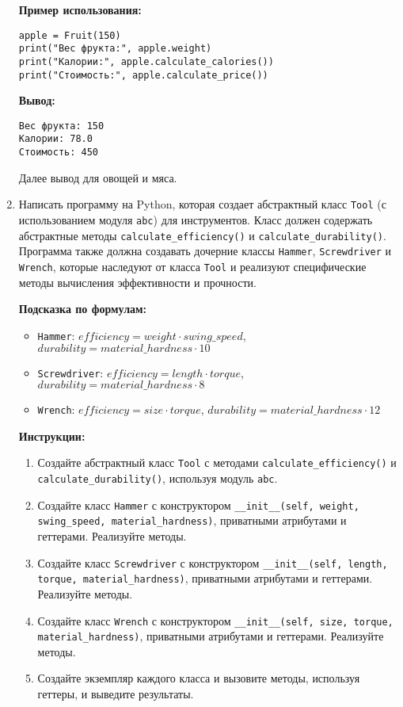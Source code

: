 \begin{enumerate}
\textbf{Пример использования:}
\begin{verbatim}
apple = Fruit(150)
print("Вес фрукта:", apple.weight)
print("Калории:", apple.calculate_calories())
print("Стоимость:", apple.calculate_price())
\end{verbatim}

\textbf{Вывод:}
\begin{verbatim}
Вес фрукта: 150
Калории: 78.0
Стоимость: 450
\end{verbatim}

Далее вывод для овощей и мяса.

\item
Написать программу на Python, которая создает абстрактный класс \texttt{Tool} (с использованием модуля \texttt{abc}) для инструментов. 
Класс должен содержать абстрактные методы \texttt{calculate\_efficiency()} и \texttt{calculate\_durability()}. 
Программа также должна создавать дочерние классы \texttt{Hammer}, \texttt{Screwdriver} и \texttt{Wrench}, 
которые наследуют от класса \texttt{Tool} и реализуют специфические методы вычисления эффективности и прочности.

\textbf{Подсказка по формулам:}
\begin{itemize}
    \item \texttt{Hammer}: $efficiency = weight \cdot swing\_speed$, $durability = material\_hardness \cdot 10$
    \item \texttt{Screwdriver}: $efficiency = length \cdot torque$, $durability = material\_hardness \cdot 8$
    \item \texttt{Wrench}: $efficiency = size \cdot torque$, $durability = material\_hardness \cdot 12$
\end{itemize}

\textbf{Инструкции:}
\begin{enumerate}
    \item Создайте абстрактный класс \texttt{Tool} с методами \texttt{calculate\_efficiency()} и \texttt{calculate\_durability()}, используя модуль \texttt{abc}.
    \item Создайте класс \texttt{Hammer} с конструктором \texttt{\_\_init\_\_(self, weight, swing\_speed, material\_hardness)}, приватными атрибутами и геттерами. Реализуйте методы.
    \item Создайте класс \texttt{Screwdriver} с конструктором \texttt{\_\_init\_\_(self, length, torque, material\_hardness)}, приватными атрибутами и геттерами. Реализуйте методы.
    \item Создайте класс \texttt{Wrench} с конструктором \texttt{\_\_init\_\_(self, size, torque, material\_hardness)}, приватными атрибутами и геттерами. Реализуйте методы.
    \item Создайте экземпляр каждого класса и вызовите методы, используя геттеры, и выведите результаты.
\end{enumerate}


\end{enumerate}
